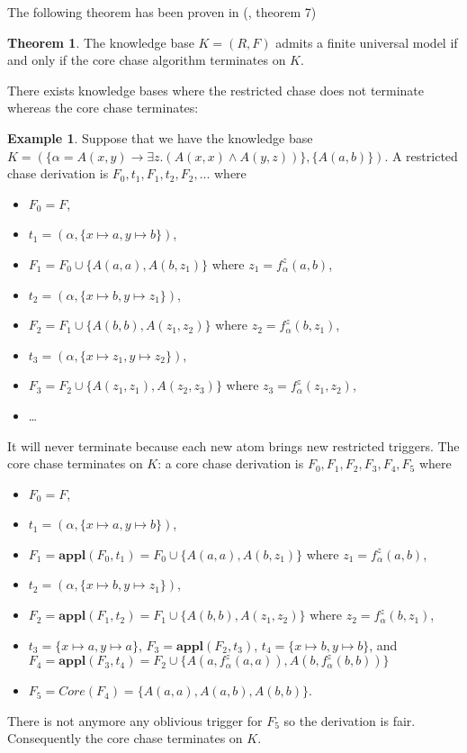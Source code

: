 \documentclass{article}
\theoremstyle{definition}
\newtheorem{theorem}{Theorem}[section]
\newtheorem{example}{Example}[section]
\theoremstyle{remark}
\newcommand{\Appl}{\textbf{appl}}
\begin{document}
The following theorem has been proven in (\cite{core_chase}, theorem 7)

\begin{theorem}
The knowledge base $K = (R,F)$ admits a finite universal model if and only if the core chase algorithm terminates on $K$.
\end{theorem}


There exists knowledge bases where the restricted chase does not terminate whereas the core chase terminates:

\begin{example}
Suppose that we have the knowledge base $K=(\{\alpha = A(x,y) \rightarrow \exists z.(A(x,x) \wedge A(y,z))\},\{A(a,b)\})$. A restricted chase derivation is $F_0,t_1,F_1,t_2,F_2,...$ where 
\begin{itemize}
\item $F_0 = F$,
\item $t_1=(\alpha,\{x \mapsto a, y \mapsto b\})$, 
\item $F_1= F_0 \cup \{A(a,a),A(b,z_1)\}$ where $z_1 = f_\alpha^z(a,b)$,
\item $t_2 = (\alpha,\{x \mapsto b, y \mapsto z_1\})$, 
\item $F_2 = F_1 \cup \{A(b,b),A(z_1,z_2)\}$ where $z_2 = f_\alpha^z(b,z_1)$, 
\item $t_3 = (\alpha,\{x \mapsto z_1, y \mapsto z_2\})$, 
\item $F_3 =  F_2 \cup \{A(z_1,z_1),A(z_2,z_3)\}$ where $z_3 = f_\alpha^z(z_1,z_2)$,
\item \ldots\
\end{itemize}
It will never terminate because each new atom brings new restricted triggers. The core chase terminates on $K$: a core chase derivation is $F_0,F_1,F_2,F_3,F_4,F_5$ where 
\begin{itemize}
\item $F_0=F$, 
\item $t_1=(\alpha,\{x \mapsto a, y \mapsto b\})$, 
\item $F_1=\Appl(F_0,t_1) =F_0 \cup \{A(a,a),A(b,z_1)\}$ where $z_1 = f_\alpha^z(a,b)$, 
\item $t_2 = (\alpha,\{x \mapsto b, y \mapsto z_1\})$,
\item $F_2 =\Appl(F_1,t_2) =F_1 \cup \{A(b,b),A(z_1,z_2)\}$ where $z_2 = f_\alpha^z(b,z_1)$,
\item $t_3 = \{x \mapsto a, y \mapsto a\}$, $F_3=\Appl(F_2,t_3)$, $t_4 = \{x \mapsto b, y \mapsto b\}$, and $F_4=\Appl(F_3,t_4) = F_2 \cup \{A(a,f_\alpha^z(a,a)),A(b,f_\alpha^z(b,b))\}$
\item $F_5 = \textit{Core}(F_4)= \{A(a,a),A(a,b),A(b,b)\}$.
\end{itemize} 
There is not anymore any oblivious trigger for $F_5$ so the derivation is fair. Consequently the core chase terminates on $K$.

\end{example}
\end{document}
